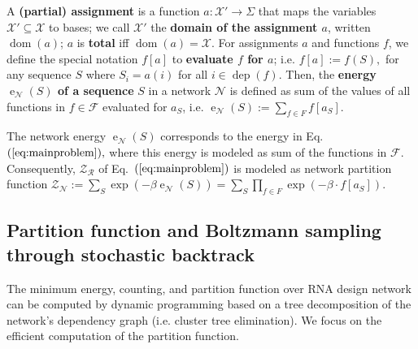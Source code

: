 \documentclass{bioinfo}
\newcommand{\network}{\mathcal{N}}
\newcommand{\dom}{\operatorname{dom}} %
\newcommand{\val}{a} %
\newcommand{\dep}{\operatorname{dep}}
\newcommand{\energy}[1]{\operatorname{e}_{#1}}
\newcommand{\numberof}{\operatorname{\#}}
\newcommand{\partfun}[1]{\mathcal{Z}_{#1}}
\newcommand{\F}{\mathcal{F}}
\newcommand{\R}{\mathcal{R}}
\newcommand{\X}{\mathcal{X}}
\newcommand{\Def}[1]{{\bf #1}}
\begin{document}
A \Def{(partial) assignment} is a function $\val: \X' \to \Sigma$
that maps the variables $\X'\subseteq \X$ to bases; we call $\X'$ the \Def{domain of the assignment
  $\val$}, written $\dom(\val)$; $\val$ is \Def{total} iff $\dom(\val)=\X.$
%
For assignments $\val$ and functions $f$, we define the
special notation $f[a]$ to \Def{evaluate $f$ for $\val$}; i.e.{}
$f[\val] := f(S),$ for any sequence $S$ where $S_i=\val(i)$ for all
$i\in\dep(f).$ Then, the \Def{energy $\energy{\network}(S)$ of a
  sequence} $S$ in a network $\network$ is defined as sum of the
values of all functions in $f\in\F$ evaluated for $\val_S$, i.e.
$\energy{\network}(S) := \sum_{f\in F} f[\val_S].$

The network energy $\energy{\network}(S)$ corresponds to the energy in
Eq.~$(\ref{eq:mainproblem}),$ where this energy is modeled as sum of
the functions in $\F$. Consequently, $\partfun{\R}$ of
Eq.~$(\ref{eq:mainproblem})$ is modeled as network partition function
$\partfun{\network} := \sum_{S}\exp(-\beta\energy{\network}(S)) = \sum_{S}\prod_{f\in F} \exp( -\beta\cdot
f[\val_S] ).$



\subsection{Partition function and Boltzmann sampling through stochastic backtrack}\label{sec:PF}
The minimum energy, counting, and partition function
over RNA design network can be computed by dynamic programming based
on a tree decomposition of the network's dependency graph
(i.e. cluster tree elimination).
We focus on the efficient computation of the partition
function. %
\end{document}
